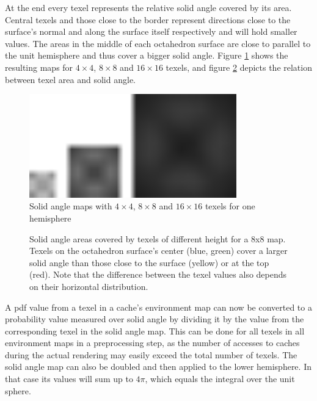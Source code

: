 At the end every texel represents the relative solid angle covered by its area. Central texels and those close to the border represent directions close to the surface's normal and along the surface itself respectively and will hold smaller values. The areas in the middle of each octahedron surface are close to parallel to the unit hemisphere and thus cover a bigger solid angle. Figure \ref{solid_angle_map} shows the resulting maps for $4\times 4$, $8\times 8$ and $16\times 16$ texels, and figure \ref{solid_angle_skizze} depicts the relation between texel area and solid angle.

\begin{figure}[ht]
	\centering
  \includegraphics[width=0.8\textwidth]{bilder/solid_angle_maps.png}
	\caption{Solid angle maps with $4\times 4$, $8\times 8$ and $16\times 16$ texels for one hemisphere}
	\label{solid_angle_map}
\end{figure}

\begin{figure}[ht]
\centering
\def\svgwidth{200pt}

\caption{Solid angle areas covered by texels of different height for a 8x8 map. Texels on the octahedron surface's center (blue, green) cover a larger solid angle than those close to the surface (yellow) or at the top (red).\newline
Note that the difference between the texel values also depends on their horizontal distribution.}
\label{solid_angle_skizze}
\end{figure}

A pdf value from a texel in a cache's environment map can now be converted to a probability value measured over solid angle by dividing it by the value from the corresponding texel in the solid angle map. This can be done for all texels in all environment maps in a preprocessing step, as the number of accesses to caches during the actual rendering may easily exceed the total number of texels. \newline
The solid angle map can also be doubled and then applied to the lower hemisphere. In that case its values will sum up to $4\pi$, which equals the integral over the unit sphere.

